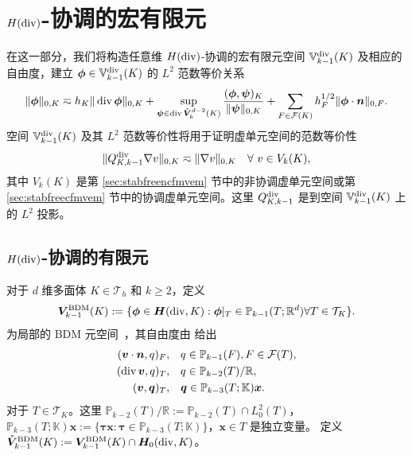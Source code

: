 \section{$H(\operatorname{div})$-协调的宏有限元}
在这一部分，我们将构造任意维 $H(\operatorname{div})$-协调的宏有限元空间
$\mathbb{V}_{k-1}^{\rm div}(K)$ 及相应的自由度，建立
$\boldsymbol{\phi}\in\mathbb{V}_{k-1}^{\rm div}(K)$ 的 $L^2$ 范数等价关系
\begin{equation*}%
\|\boldsymbol{\phi}\|_{0,K}\eqsim h_K\|\diver\boldsymbol{\phi}\|_{0,K} + \sup_{\boldsymbol{\psi}\in\diver\mathring{\boldsymbol{V}}_{k}^{d-2}(K)}\frac{(\boldsymbol{\phi}, \boldsymbol{\psi})_K}{\|\boldsymbol{\psi}\|_{0,K}} +\sum_{F\in\mathcal F(K)}h_F^{1/2}\|\boldsymbol{\phi}\cdot\boldsymbol{n}\|_{0,F}.
\end{equation*}
空间 $\mathbb{V}_{k-1}^{\rm div}(K)$ 及其 $L^2$ 范数等价性将用于证明虚单元空间的范数等价性
\begin{equation*}%
\|Q_{K,k-1}^{\diver}\nabla v\|_{0,K}\eqsim \|\nabla v\|_{0,K} \quad \forall~v\in V_k(K),
\end{equation*}
其中 $V_k(K)$ 是第 \ref{sec:stabfreencfmvem} 节中的非协调虚单元空间或第
\ref{sec:stabfreecfmvem} 节中的协调虚单元空间。这里 $Q_{K,k-1}^{\operatorname{div}}$
是到空间 $\mathbb{V}_{k-1}^{\rm div}(K)$ 上的 $L^2$ 投影。

\subsection{$H(\operatorname{div})$-协调的有限元}
对于 $d$ 维多面体 $K\in \mathcal T_h$ 和 $k\geq2$，定义
\[
\boldsymbol{V}_{k-1}^{\mathrm{BDM}}(K):=\{\boldsymbol{\phi}\in\boldsymbol{H}(\operatorname{div},
K): \boldsymbol{\phi}|_{T}\in \mathbb P_{k-1}(T;\mathbb R^d) \forall
T\in\mathcal T_K\}.
\]
为局部的 BDM 元空间~\cite{BrezziDouglasMarini1986,BrezziDouglasDuranFortin1987,Nedelec:1986family}，其自由度由 \cite{ChenHuang2021divdiv} 给出
\begin{align}
(\boldsymbol{v}\cdot\boldsymbol{n}, q)_F, & \quad q\in \mathbb P_{k-1}(F), F\in\mathcal F(T), \label{BDMdof1} \\
(\operatorname{div}\boldsymbol{v}, q)_T, & \quad q\in \mathbb P_{k-2}(T)/\mathbb R, \label{BDMdof2} \\
(\boldsymbol{v}, \boldsymbol{q})_T, & \quad \boldsymbol{q}\in \mathbb
P_{k-3}(T;\mathbb K)\boldsymbol{x} \label{BDMdof3}.
\end{align}
对于 $T\in\mathcal T_K$。这里 $\mathbb P_{k-2}(T)/\mathbb R:=\mathbb P_{k-2}(T)\cap L_0^2(T)$，$\mathbb P_{k-3}(T;\mathbb K)\boldsymbol{x}:=\{\boldsymbol{\tau}\boldsymbol{x}: \boldsymbol{\tau}\in \mathbb P_{k-3}(T;\mathbb K)\}$，$\boldsymbol{x}\in T$ 是独立变量。
定义 $\mathring{\boldsymbol{V}}_{k-1}^{\mathrm{BDM}}(K):=\boldsymbol{V}_{k-1}^{\mathrm{BDM}}(K)\cap \boldsymbol{H}_0(\operatorname{div}, K)$。

